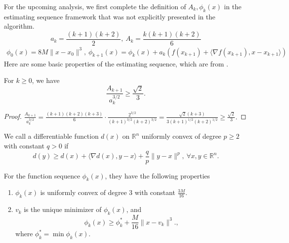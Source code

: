 \documentclass{mcom-l}
\numberwithin{equation}{section}
\begin{document}
For the upcoming analysis, we first complete the definition of $A_k,\phi_k(x)$ in the estimating sequence framework that was not explicitly presented in the algorithm.
\begin{equation}
    \label{eq.update a and A}
    a_k = \frac{(k+1)(k+2)}{2}, \ A_k=\frac{k(k+1)(k+2)}{6}
\end{equation}
\begin{align}\label{eq.update phi}
    \phi_0(x) = 8M\|x-x_0\|^3, \ \phi_{k+1}(x) =\phi_k(x)+a_k\left (f(x_{k+1})+\langle \nabla f(x_{k+1}),x-x_{k+1}\rangle \right )
\end{align}
Here are some basic properties of the estimating sequence, which are from \citet{nesterov_lectures_2018}.
\begin{lemma}
    \label{lem.magnitude a and A}
    For $k\geq 0$, we have
    \begin{equation}
        \label{eq.magnitude a and A}
        \frac{A_{k+1}}{a_k^{3/2}} \geq \frac{\sqrt{2}}{3}.
    \end{equation}
\end{lemma}
\begin{proof}
    $\frac{A_{k+1}}{a_k^{3/2}}= \frac{(k+1)(k+2)(k+3)}{6}\cdot \frac{2^{3/2}}{(k+1)^{3/2}(k+2)^{3/2}} = \frac{\sqrt{2}(k+3)}{3(k+1)^{1/2}(k+2)^{1/2}} \geq \frac{\sqrt{2}}{3}.$
\end{proof}
We call a differentiable function $d(x)$ on $\mathbb{R}^n$ uniformly convex \citet[Section 4.2.2]{nesterov_lectures_2018} of degree $p\geq 2$ with constant $q>0$ if
\begin{equation}
    \label{eq.uniformly convex of p}
    d(y)\geq d(x)+\langle \nabla d(x),y-x\rangle +\frac{q}{p}\|y-x\|^p, \ \forall x,y\in\mathbb{R}^n.
\end{equation}
\begin{lemma}
    \label{lem.property of phi}
    For the function sequence $\phi_k(x)$, they have the following properties
    \begin{enumerate}
        \item $\phi_k(x)$ is uniformly convex of degree $3$ with constant $\frac{3M}{16}$.
        \item $v_k$ is the unique minimizer of $\phi_k(x)$, and
              \begin{equation}
                  \label{eq.phi_k phi_low}
                  \phi_k(x)\geq \phi_k^* + \frac{M}{16}\|x-v_k\|^3.,
              \end{equation}
              where $\phi_k^* =\min \phi_k(x).$
    \end{enumerate}
\end{lemma}
\end{document}
